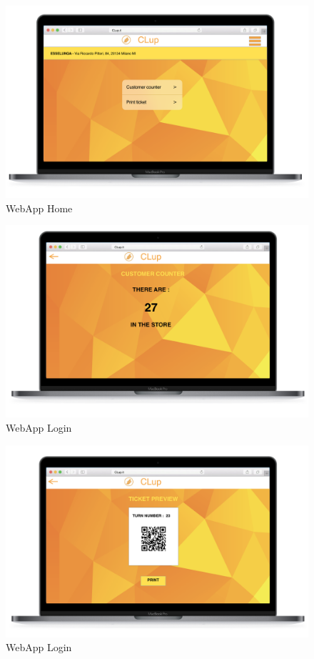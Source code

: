 \documentclass{article}
\begin{document}
\begin{figure}[H]
  \includegraphics[width=\linewidth]{WebAppHome.png}
  \centering
  \caption{WebApp Home} 
\end{figure}

\begin{figure}[H]
  \includegraphics[width=\linewidth]{CustomerCounter.png}
  \centering
  \caption{WebApp Login} 
\end{figure}

\begin{figure}[H]
  \includegraphics[width=\linewidth]{TicketPreview.png}
  \centering
  \caption{WebApp Login} 
\end{figure}
\end{document}
